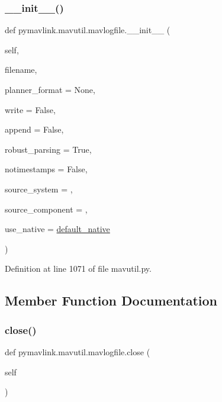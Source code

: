 \subsubsection{\texorpdfstring{\_\_init\_\_()}{\_\_init\_\_()}}
{\footnotesize\ttfamily def pymavlink.\+mavutil.\+mavlogfile.\+\_\+\+\_\+init\+\_\+\+\_\+ (\begin{DoxyParamCaption}\item[{}]{self,  }\item[{}]{filename,  }\item[{}]{planner\+\_\+format = {\ttfamily None},  }\item[{}]{write = {\ttfamily False},  }\item[{}]{append = {\ttfamily False},  }\item[{}]{robust\+\_\+parsing = {\ttfamily True},  }\item[{}]{notimestamps = {\ttfamily False},  }\item[{}]{source\+\_\+system = {},  }\item[{}]{source\+\_\+component = {},  }\item[{}]{use\+\_\+native = {\ttfamily \mbox{\hyperlink{namespacepymavlink_1_1mavutil_a21ce9da7b698a7bc21c44b9f77341b62}{default\+\_\+native}}} }\end{DoxyParamCaption})}



Definition at line 1071 of file mavutil.\+py.



\subsection{Member Function Documentation}
\mbox{\label{classpymavlink_1_1mavutil_1_1mavlogfile_af5763cfaff07bf0270943e98f9a10556}} 
\subsubsection{\texorpdfstring{close()}{close()}}
{\footnotesize\ttfamily def pymavlink.\+mavutil.\+mavlogfile.\+close (\begin{DoxyParamCaption}\item[{}]{self }\end{DoxyParamCaption})}



